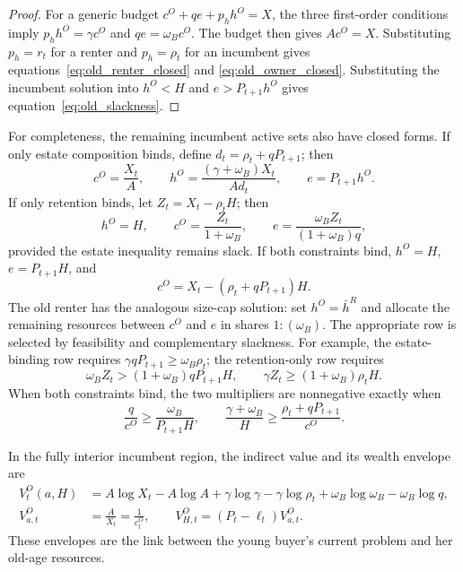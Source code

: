 \documentclass[11pt]{article}
\theoremstyle{definition}
\theoremstyle{remark}
\begin{document}
\begin{proof}
For a generic budget $c^O+qe+p_hh^O=X$, the three first-order conditions imply
$p_hh^O=\gamma c^O$ and $qe=\omega_Bc^O$.  The budget then gives
$Ac^O=X$.  Substituting $p_h=r_t$ for a renter and $p_h=\rho_t$ for an
incumbent gives equations~\eqref{eq:old_renter_closed} and
\eqref{eq:old_owner_closed}.  Substituting the incumbent solution into
$h^O<H$ and $e>P_{t+1}h^O$ gives equation~\eqref{eq:old_slackness}.
\end{proof}

For completeness, the remaining incumbent active sets also have closed forms.
If only estate composition binds, define $d_t=\rho_t+qP_{t+1}$; then
\begin{equation}
 c^O=\frac{X_t}{A},\qquad
 h^O=\frac{(\gamma+\omega_B)X_t}{Ad_t},\qquad
 e=P_{t+1}h^O.
 \label{eq:old_estate_binding}
\end{equation}
If only retention binds, let $Z_t=X_t-\rho_tH$; then
\begin{equation}
 h^O=H,\qquad
 c^O=\frac{Z_t}{1+\omega_B},\qquad
 e=\frac{\omega_BZ_t}{(1+\omega_B)q},
 \label{eq:old_retention_binding}
\end{equation}
provided the estate inequality remains slack.  If both constraints bind,
$h^O=H$, $e=P_{t+1}H$, and
\begin{equation}
 c^O=X_t-(\rho_t+qP_{t+1})H.
 \label{eq:old_both_binding}
\end{equation}
The old renter has the analogous size-cap solution: set $h^O=\bar h^R$ and
allocate the remaining resources between $c^O$ and $e$ in shares
$1:(\omega_B)$.
The appropriate row is selected by feasibility and complementary slackness.
For example, the estate-binding row requires
$\gamma qP_{t+1}\geq\omega_B\rho_t$; the retention-only row requires
\begin{equation}
 \omega_BZ_t>(1+\omega_B)qP_{t+1}H,\qquad
 \gamma Z_t\geq(1+\omega_B)\rho_tH.
 \label{eq:retention_only_conditions}
\end{equation}
When both constraints bind, the two multipliers are nonnegative exactly when
\begin{equation}
 \frac{q}{c^O}\geq\frac{\omega_B}{P_{t+1}H},
 \qquad
 \frac{\gamma+\omega_B}{H}\geq\frac{\rho_t+qP_{t+1}}{c^O}.
 \label{eq:both_old_multipliers}
\end{equation}

In the fully interior incumbent region, the indirect value and its wealth
envelope are
\begin{align}
 V_t^O(a,H)
 &=A\log X_t-A\log A+\gamma\log\gamma-\gamma\log\rho_t
   +\omega_B\log\omega_B-\omega_B\log q,
 \label{eq:old_indirect}\\
 V_{a,t}^O&=\frac{A}{X_t}=\frac{1}{c_t^O},\qquad
 V_{H,t}^O=(P_t-\ell_t)V_{a,t}^O.
 \label{eq:old_envelopes}
\end{align}
These envelopes are the link between the young buyer's current problem and
her old-age resources.
\end{document}
